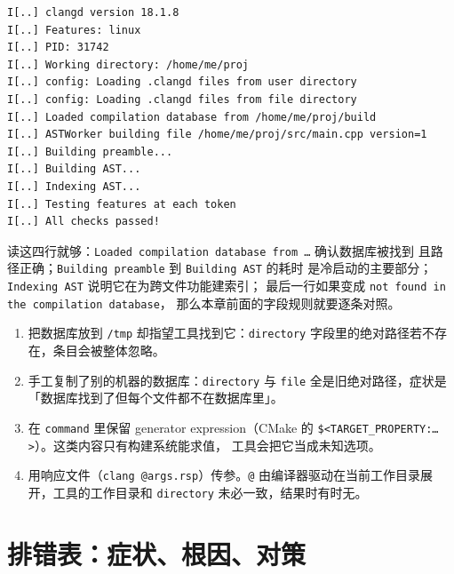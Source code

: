 \documentclass[12pt,a4paper,fontset=fandol]{ctexbook}
\begin{document}
\begin{lstlisting}[style=shellstyle,caption={clangd --check 的输出（截断，右侧为解读）},label={lst:ch02-check}]
I[..] clangd version 18.1.8
I[..] Features: linux
I[..] PID: 31742
I[..] Working directory: /home/me/proj
I[..] config: Loading .clangd files from user directory
I[..] config: Loading .clangd files from file directory
I[..] Loaded compilation database from /home/me/proj/build
I[..] ASTWorker building file /home/me/proj/src/main.cpp version=1
I[..] Building preamble...
I[..] Building AST...
I[..] Indexing AST...
I[..] Testing features at each token
I[..] All checks passed!
\end{lstlisting}

读这四行就够：\texttt{Loaded compilation database from \dots} 确认数据库被找到
且路径正确；\texttt{Building preamble} 到 \texttt{Building AST} 的耗时
是冷启动的主要部分；\texttt{Indexing AST} 说明它在为跨文件功能建索引；
最后一行如果变成 \texttt{not found in the compilation database}，
那么本章前面的字段规则就要逐条对照。

\begin{warning}[title={生成数据库时的四个高频错误}]
\begin{enumerate}
  \item 把数据库放到 \texttt{/tmp} 却指望工具找到它：\texttt{directory}
        字段里的绝对路径若不存在，条目会被整体忽略。
  \item 手工复制了别的机器的数据库：\texttt{directory} 与 \texttt{file}
        全是旧绝对路径，症状是「数据库找到了但每个文件都不在数据库里」。
  \item 在 \texttt{command} 里保留 generator expression（CMake 的
        \texttt{\$<TARGET\_PROPERTY:\dots>}）。这类内容只有构建系统能求值，
        工具会把它当成未知选项。
  \item 用响应文件（\texttt{clang @args.rsp}）传参。\texttt{@}
        由编译器驱动在当前工作目录展开，工具的工作目录和
        \texttt{directory} 未必一致，结果时有时无。
\end{enumerate}
\end{warning}

\section{排错表：症状、根因、对策}
\label{sec:ch02-s7}
\end{document}
